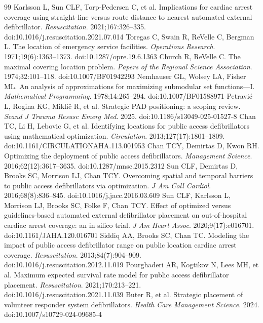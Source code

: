 \documentclass[11pt]{article}
\begin{document}
\begin{thebibliography}{99}
 Karlsson L, Sun CLF, Torp-Pedersen C, et al. Implications for cardiac arrest coverage using straight-line versus route distance to nearest automated external defibrillator. \emph{Resuscitation}. 2021;167:326--335. doi:10.1016/j.resuscitation.2021.07.014
 Toregas C, Swain R, ReVelle C, Bergman L. The location of emergency service facilities. \emph{Operations Research}. 1971;19(6):1363--1373. doi:10.1287/opre.19.6.1363
 Church R, ReVelle C. The maximal covering location problem. \emph{Papers of the Regional Science Association}. 1974;32:101--118. doi:10.1007/BF01942293
 Nemhauser GL, Wolsey LA, Fisher ML. An analysis of approximations for maximizing submodular set functions---I. \emph{Mathematical Programming}. 1978;14:265--294. doi:10.1007/BF01588971
 Petravi\'c L, Rogina KG, Mikli\v{c} R, et al. Strategic PAD positioning: a scoping review. \emph{Scand J Trauma Resusc Emerg Med}. 2025. doi:10.1186/s13049-025-01527-8
 Chan TC, Li H, Lebovic G, et al. Identifying locations for public access defibrillators using mathematical optimization. \emph{Circulation}. 2013;127(17):1801--1809. doi:10.1161/CIRCULATIONAHA.113.001953
 Chan TCY, Demirtas D, Kwon RH. Optimizing the deployment of public access defibrillators. \emph{Management Science}. 2016;62(12):3617--3635. doi:10.1287/mnsc.2015.2312
 Sun CLF, Demirtas D, Brooks SC, Morrison LJ, Chan TCY. Overcoming spatial and temporal barriers to public access defibrillators via optimization. \emph{J Am Coll Cardiol}. 2016;68(8):836--845. doi:10.1016/j.jacc.2016.03.609
 Sun CLF, Karlsson L, Morrison LJ, Brooks SC, Folke F, Chan TCY. Effect of optimized versus guidelines-based automated external defibrillator placement on out-of-hospital cardiac arrest coverage: an in silico trial. \emph{J Am Heart Assoc}. 2020;9(17):e016701. doi:10.1161/JAHA.120.016701
 Siddiq AA, Brooks SC, Chan TC. Modeling the impact of public access defibrillator range on public location cardiac arrest coverage. \emph{Resuscitation}. 2013;84(7):904--909. doi:10.1016/j.resuscitation.2012.11.019
 Pourghaderi AR, Kogtikov N, Lees MH, et al. Maximum expected survival rate model for public access defibrillator placement. \emph{Resuscitation}. 2021;170:213--221. doi:10.1016/j.resuscitation.2021.11.039
 Buter R, et al. Strategic placement of volunteer responder system defibrillators. \emph{Health Care Management Science}. 2024. doi:10.1007/s10729-024-09685-4

\end{thebibliography}
\end{document}
